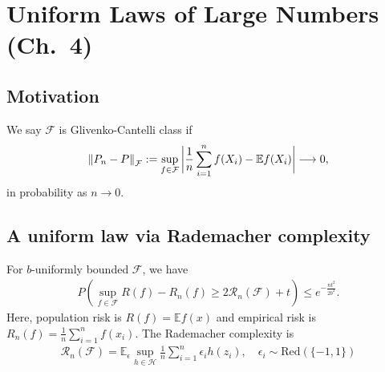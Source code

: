 \section{Uniform Laws of Large Numbers {(Ch.~4)}}
\subsection{Motivation}
\begin{definition}
We say $\mathcal{F}$ is Glivenko-Cantelli class if
$$ \left\lVert P_n - P \right\rVert_{\mathcal{F}} := \sup_{f \in \mathcal{F}} \bigg| \frac{1}{n} \sum_{i=1}^n f(X_i) - \mathbb{E} f(X_i) \bigg| \longrightarrow 0,
$$
in probability as $n \rightarrow 0$.
\end{definition}
\subsection{A uniform law via Rademacher complexity}
\begin{theorem} For $b$-uniformly bounded $\mathcal{F}$, we have
\begin{align*}
    P\left(\sup_{f\in \mathcal{F}} R(f) - R_n(f) \geq 2 \mathcal{R}_n(\mathcal{F}) + t\right) \leq e^{-\frac{nt^2}{2b^2}}.
\end{align*}
Here, population risk is $R(f) = \mathbb{E} f(x)$ and empirical risk is $R_n(f) = \frac{1}{n} \sum_{i=1}^n f(x_i)$. The Rademacher complexity is
\begin{align*}
    \mathcal{R}_{n}(\mathcal{F})=\mathbb{E}_{\epsilon} \sup _{h \in \mathcal{H}} \frac{1}{n} \sum_{i=1}^{n} \epsilon_{i} h(z_i), \quad \epsilon_i \sim \mathrm{Red}(\{-1, 1\})
\end{align*}
\end{theorem}
